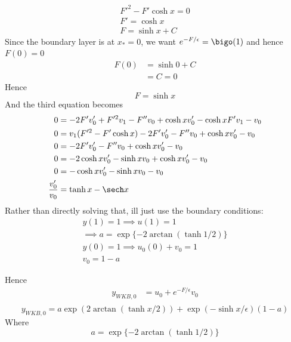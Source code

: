 \documentclass{X:/Documents/Coding/Latex/myassignment}
\begin{document}
\begin{enumerate}
\begin{enumerate}
		\begin{align*}
			F'^2 - F'\cosh x = 0\\
			F' = \cosh x\\
			F = \sinh x +C
		\end{align*}
		Since the boundary layer is at $x_* = 0$, we want $e^{-F/\epsilon} = \bigo(1)$ and hence $F(0) = 0$
		\begin{align*}
			F(0) &= \sinh 0 + C\\
			&= C = 0
		\end{align*}
		Hence
		\[F = \sinh x\]
		And the third equation becomes
		\begin{align*}
			0&=-2F'v_0' + F'^2 v_1 - F''v_0 +\cosh x v_0' -\cosh x F' v_1 - v_0\\
			0&=v_1(F'^2 - F' \cosh x) -2F'v_0'- F''v_0 +\cosh x v_0' - v_0\\
			0&=-2F'v_0'- F''v_0 +\cosh x v_0' - v_0\\
			0&= -2\cosh x v_0' - \sinh x v_0  + \cosh x v_0' - v_0\\
			0&= -\cosh x v_0' - \sinh x v_0  - v_0\\
			\frac{v_0'}{v_0} &= \tanh x - \sech x\\
		\end{align*}
		Rather than directly solving that, ill just use the boundary conditions:
		\begin{align*}
			y(1) = 1 \implies u(1) = 1\\
			\implies a=\exp\{-2\arctan\left(\tanh 1/2\right)\}\\
			y(0) = 1 \implies u_0(0) + v_0 = 1\\
			v_0 = 1- a
		\end{align*}

		Hence
		\begin{align*}
			y_{WKB,0} &= u_0 + e^{-F/\epsilon} v_0\\
		\end{align*}
		\[\boxed{y_{WKB,0}=a\exp\left(2\arctan\left(\tanh x/2\right)\right)+ \exp\left(-\sinh x/\epsilon\right)(1-a) }\]
		Where
		\[a =\exp\{-2\arctan\left(\tanh 1/2\right)\}\]




\end{enumerate}
\end{enumerate}
\end{document}
